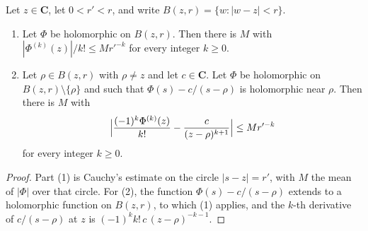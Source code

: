 \begin{lemma}\label{wl-pole-coefficients}
Let $z\in\mathbf C$, let $0<r'<r$, and write $B(z,r)=\{w:|w-z|<r\}$.
\begin{enumerate}
\item Let $\Phi$ be holomorphic on $B(z,r)$. Then there is $M$ with
  $|\Phi^{(k)}(z)|/k!\leq Mr'^{-k}$ for every integer $k\geq0$.
\item Let $\rho\in B(z,r)$ with $\rho\neq z$ and let $c\in\mathbf C$. Let
  $\Phi$ be holomorphic on $B(z,r)\setminus\{\rho\}$ and such that
  $\Phi(s)-c/(s-\rho)$ is holomorphic near $\rho$. Then there is $M$ with
  \[
   \Bigl|\frac{(-1)^k\Phi^{(k)}(z)}{k!}-\frac{c}{(z-\rho)^{k+1}}\Bigr|\leq Mr'^{-k}
  \]
  for every integer $k\geq0$.
\end{enumerate}
\end{lemma}
\begin{proof}
Part (1) is Cauchy's estimate on the circle $|s-z|=r'$, with $M$ the mean of
$|\Phi|$ over that circle. For (2), the function $\Phi(s)-c/(s-\rho)$ extends
to a holomorphic function on $B(z,r)$, to which (1) applies, and the $k$-th
derivative of $c/(s-\rho)$ at $z$ is $(-1)^kk!\,c\,(z-\rho)^{-k-1}$.
\end{proof}

